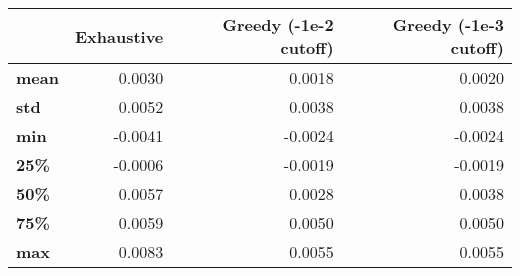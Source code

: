 \begin{tabular}{lrrr}
\toprule
{} &  Exhaustive &  Greedy (-1e-2 cutoff) &  Greedy (-1e-3 cutoff) \\
\midrule
\textbf{mean} &      0.0030 &                 0.0018 &                 0.0020 \\
\textbf{std } &      0.0052 &                 0.0038 &                 0.0038 \\
\textbf{min } &     -0.0041 &                -0.0024 &                -0.0024 \\
\textbf{25\% } &     -0.0006 &                -0.0019 &                -0.0019 \\
\textbf{50\% } &      0.0057 &                 0.0028 &                 0.0038 \\
\textbf{75\% } &      0.0059 &                 0.0050 &                 0.0050 \\
\textbf{max } &      0.0083 &                 0.0055 &                 0.0055 \\
\bottomrule
\end{tabular}
